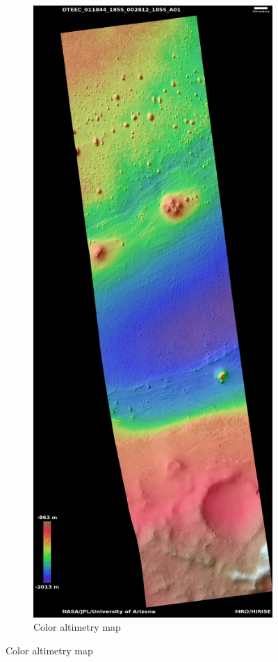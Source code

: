 \documentclass[12pt]{article}
\begin{document}
\begin{figure}[h!]
\begin{subfigure}[t]{0.27\textwidth}
    \includegraphics[height=0.4\paperheight]{figures/maps/ESP_011844_1855/DTEEC_011844_1855_002812_1855_A01.jpg}
    \caption{Color altimetry map}
    \label{fig:southwest_dtm}
  \end{subfigure}

\end{figure}
\end{document}
